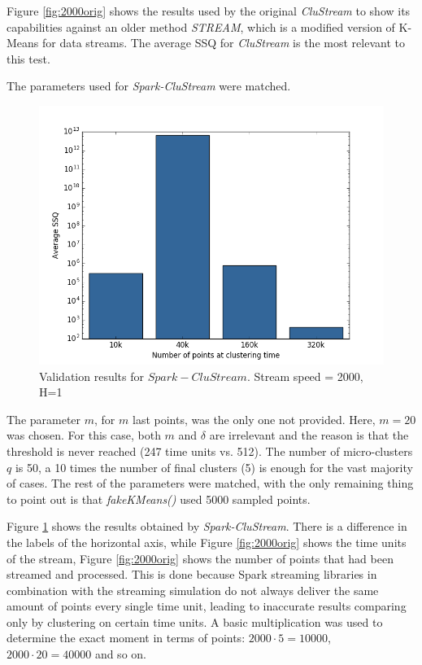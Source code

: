 \documentclass{llncs}
\begin{document}
Figure \ref{fig:2000orig} shows the results used by the original \textit{CluStream} to show its capabilities against an older method \textit{STREAM}, which is a modified version of K-Means for data streams. The average SSQ for \textit{CluStream} is the most relevant to this test.

The parameters used for \textit{Spark-CluStream} were matched. 

\begin{figure}[h!]
 \centering
 \includegraphics[scale=0.5]{./styles/2000h1.png}
 \caption{Validation results for $Spark-CluStream$. Stream speed = 2000, H=1}
 \label{fig:2000}
\end{figure}

The parameter $m$, for $m$ last points, was the only one not provided. Here, $m=20$ was chosen. For this case, both $m$ and $\delta$ are irrelevant and the reason is that the threshold is never reached (247 time units vs. 512). The number of micro-clusters $q$ is 50, a 10 times the number of final clusters (5) is enough for the vast majority of cases\cite{clustreamOrig}. The rest of the parameters were matched, with the only remaining thing to point out is that \textit{fakeKMeans()} used 5000 sampled points.

Figure \ref{fig:2000} shows the results obtained by \textit{Spark-CluStream}. There is a difference in the labels of the horizontal axis, while Figure \ref{fig:2000orig} shows the time units of the stream, Figure \ref{fig:2000orig} shows the number of points that had been streamed and processed. This is done because Spark streaming libraries in combination with the streaming simulation do not always deliver the same amount of points every single time unit, leading to inaccurate results comparing only by clustering on certain time units. A basic multiplication was used to determine the exact moment in terms of points: $2000\cdot 5 = 10000$, $2000\cdot 20 = 40000$ and so on.
\end{document}
